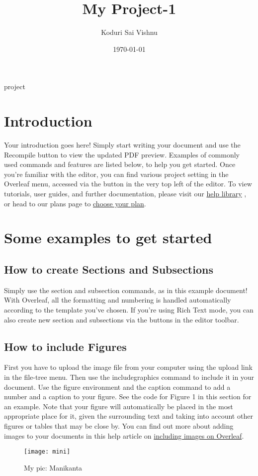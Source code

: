 \documentclass{article}
\title{My Project-1}
\author{Koduri Sai Vishnu}
\date{\today}
\begin{document}
	\maketitle
	 \hspace{4.50cm} {project}
\section{Introduction}
  Your introduction goes here! Simply start writing your document and use the Recompile button to
  view the updated PDF preview. Examples of commonly used commands and features are listed below,
  to help you get started.\vspace{5mm} Once you’re familiar with the editor, you can find various project setting in the Overleaf menu,
  accessed via the button in the very top left of the editor. To view tutorials, user guides, and further
  documentation, please visit our \href{www.#.com}{help library} , or head to our plans page to \href{www.#.com}{choose your plan}.
 \section{Some examples to get started}
 \subsection{How to create Sections and Subsections}
 Simply use the section and subsection commands, as in this example document! With Overleaf, all
 the formatting and numbering is handled automatically according to the template you’ve chosen. If
 you’re using Rich Text mode, you can also create new section and subsections via the buttons in the
 editor toolbar.
 
 \subsection{How to include Figures}
 First you have to upload the image file from your computer using the upload link in the file-tree menu.
 Then use the includegraphics command to include it in your document. Use the figure environment
 and the caption command to add a number and a caption to your figure. See the code for Figure 1 in
 this section for an example.
 Note that your figure will automatically be placed in the most appropriate place for it, given the
 surrounding text and taking into account other figures or tables that may be close by. You can find
 out more about adding images to your documents in this help article on \href{www.#.com}{including images on Overleaf}.
\begin{figure}
	\centering
	\texttt{[image: mini]}
	\caption{My pic: Manikanta}
	\label{fig:mani9}
\end{figure}
\end{document}
